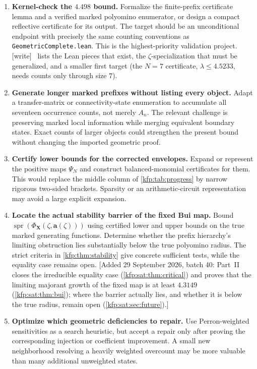 \documentclass[11pt,a4paper]{article}
\theoremstyle{definition}
\theoremstyle{remark}
\newcommand{\bA}{\boldsymbol a}
\newcommand{\bX}{\boldsymbol X}
\newcommand{\spr}{\operatorname{spr}}
\newcommand{\wtag}{\textsf{\small[write]}}
\begin{document}
\begin{enumerate}[label=\textbf{\arabic*.},leftmargin=2em]
\item \textbf{Kernel-check the $4.498$ bound.}
Formalize the finite-prefix certificate lemma and a verified marked
polyomino enumerator, or design a compact reflective certificate for its
output. The target should be an unconditional endpoint with precisely the
same counting conventions as \texttt{GeometricComplete.lean}. This is the
highest-priority validation project.
\wtag\  lists the Lean pieces that exist, the
$\zeta$-specialization that must be generalized, and a smaller first target
(the $N=7$ certificate, $\lambda\leq4.5233$, needs counts only through size
$7$).

\item \textbf{Generate longer marked prefixes without listing every object.}
Adapt a transfer-matrix or connectivity-state enumeration to accumulate all
seventeen occurrence counts, not merely $A_n$. The relevant challenge is
preserving marked local information while merging equivalent boundary
states. Exact counts of larger objects could strengthen the present bound
without changing the imported geometric proof.

\item \textbf{Certify lower bounds for the corrected envelopes.}
Expand or represent the positive maps $\Psi_N$ and construct balanced-monomial
certificates for them. This would replace the middle column of
\cref{kfp:tab:progress} by narrow rigorous two-sided brackets. Sparsity or an
arithmetic-circuit representation may avoid a large explicit expansion.

\item \textbf{Locate the actual stability barrier of the fixed Bui map.}
Bound $\spr(\Phi_{\bX}(\zeta,\bA(\zeta)))$ using certified lower and upper
bounds on the true marked generating functions. Determine whether the
prefix hierarchy's limiting obstruction lies substantially below the true
polyomino radius. The strict criteria in \cref{kfp:thm:stability} give concrete
sufficient tests, while the equality case remains open.
[Added 29 September 2026, batch 40: Part~II closes the irreducible equality
case (\cref{kfp:sat:thm:critical}) and proves that the limiting majorant
growth of the fixed map is at least $4.3149$ (\cref{kfp:sat:thm:bui}); where
the barrier actually lies, and whether it is below the true radius, remain
open (\cref{kfp:sat:sec:future}).]

\item \textbf{Optimize which geometric deficiencies to repair.}
Use Perron-weighted sensitivities as a search heuristic, but accept a repair
only after proving the corresponding injection or coefficient improvement.
A small new neighborhood resolving a heavily weighted overcount may be more
valuable than many additional unweighted states.


\end{enumerate}
\end{document}

